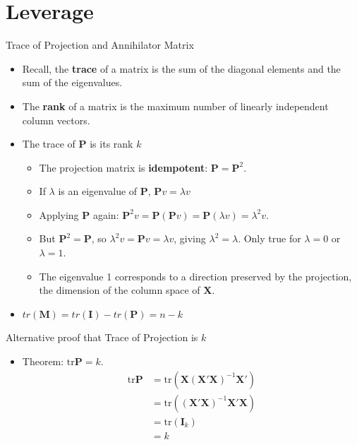 \documentclass[aspectratio=169, handout, t]{beamer}
\numberwithin{equation}{section}
\begin{document}
\section{Leverage}

\begin{frame}{Trace of Projection and Annihilator Matrix}
\begin{itemize}
\item Recall, the \textbf{trace} of a matrix is the sum of the diagonal elements and the sum of the eigenvalues.
\item The \textbf{rank} of a matrix is the maximum number of linearly independent column vectors.
\item The trace of $\bm{P}$ is its rank $k$
\begin{itemize}
\item The projection matrix is \textbf{idempotent}: $\bm{P}=\bm{P}^2$.
\item If $\lambda$ is an eigenvalue of $\bm{P}$, $\bm{P}v=\lambda v$
\item Applying $\bm{P}$ again: $\bm{P}^2v=\bm{P}(\bm{P}v)=\bm{P}(\lambda v)=\lambda^2 v$.
\item But $\bm{P}^2=\bm{P}$, so $\lambda^2 v=\bm{P}v=\lambda v$, giving $\lambda^2=\lambda$.  Only true for $\lambda=0$ or $\lambda=1$.
\item The eigenvalue 1 corresponds to a direction preserved by the projection, the dimension of the column space of $\bm{X}$.
\end{itemize}
\item $tr(\bm{M})=tr(\bm{I})-tr(\bm{P})=n-k$
\end{itemize}
\end{frame}

\begin{frame}{Alternative proof that Trace of Projection is $k$}
\begin{itemize}
\item Theorem: $\text{tr} \bm{P}=k$.
\begin{align*}
\text{tr}\bm{P}&=\text{tr}\left(\bm{X}(\bm{X}'\bm{X})^{-1}\bm{X}'\right)\\
&=\text{tr}\left((\bm{X}'\bm{X})^{-1}\bm{X}'\bm{X}\right)\\
&=\text{tr}(\bm{I}_k)\\
&=k
\end{align*}
\end{itemize}
\end{frame}
\end{document}

